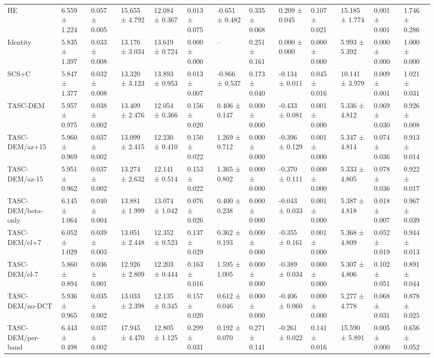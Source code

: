 \begin{table}[t]
\begin{tabular}{lllllllllllll}
HE & 6.559 ± 1.224 & 0.057 ± 0.005 & 15.655 ± 4.792 & 12.084 ± 0.367 & 0.013 ± 0.075 & -0.651 ± 0.482 & 0.335 ± 0.068 & 0.209 ± 0.045 & 0.107 ± 0.021 & 15.185 ± 1.774 & 0.001 ± 0.001 & 1.746 ± 0.286 \\
Identity & 5.835 ± 1.397 & 0.033 ± 0.008 & 13.176 ± 3.034 & 13.619 ± 0.724 & 0.000 ± 0.000 & -- & 0.251 ± 0.161 & 0.000 ± 0.000 & 0.000 ± 0.000 & 5.993 ± 5.392 & 0.000 ± 0.000 & 1.000 ± 0.000 \\
SCS+C & 5.847 ± 1.377 & 0.032 ± 0.008 & 13.320 ± 3.123 & 13.893 ± 0.953 & 0.013 ± 0.007 & -0.866 ± 0.537 & 0.173 ± 0.040 & -0.134 ± 0.011 & 0.045 ± 0.016 & 10.141 ± 3.979 & 0.009 ± 0.001 & 1.021 ± 0.031 \\
TASC-DEM & 5.957 ± 0.975 & 0.038 ± 0.002 & 13.409 ± 2.476 & 12.054 ± 0.366 & 0.156 ± 0.020 & 0.406 ± 0.147 & 0.000 ± 0.000 & -0.433 ± 0.081 & 0.001 ± 0.000 & 5.336 ± 4.812 & 0.069 ± 0.030 & 0.926 ± 0.008 \\
TASC-DEM/az+15 & 5.960 ± 0.969 & 0.037 ± 0.002 & 13.099 ± 2.415 & 12.230 ± 0.410 & 0.150 ± 0.022 & 1.269 ± 0.712 & 0.000 ± 0.000 & -0.396 ± 0.129 & 0.001 ± 0.000 & 5.347 ± 4.814 & 0.074 ± 0.036 & 0.913 ± 0.014 \\
TASC-DEM/az-15 & 5.951 ± 0.962 & 0.037 ± 0.002 & 13.274 ± 2.632 & 12.141 ± 0.514 & 0.153 ± 0.022 & 1.365 ± 0.802 & 0.000 ± 0.000 & -0.370 ± 0.111 & 0.000 ± 0.000 & 5.333 ± 4.805 & 0.078 ± 0.036 & 0.922 ± 0.017 \\
TASC-DEM/beta-only & 6.145 ± 1.064 & 0.040 ± 0.004 & 13.881 ± 1.999 & 13.074 ± 1.042 & 0.076 ± 0.026 & 0.400 ± 0.238 & 0.000 ± 0.000 & -0.043 ± 0.033 & 0.001 ± 0.000 & 5.387 ± 4.818 & 0.018 ± 0.007 & 0.967 ± 0.039 \\
TASC-DEM/el+7 & 6.052 ± 1.029 & 0.039 ± 0.003 & 13.051 ± 2.448 & 12.352 ± 0.523 & 0.137 ± 0.029 & 0.362 ± 0.193 & 0.000 ± 0.000 & -0.355 ± 0.161 & 0.001 ± 0.000 & 5.368 ± 4.809 & 0.052 ± 0.019 & 0.944 ± 0.013 \\
TASC-DEM/el-7 & 5.860 ± 0.894 & 0.036 ± 0.001 & 12.926 ± 2.809 & 12.203 ± 0.444 & 0.163 ± 0.016 & 1.595 ± 1.005 & 0.000 ± 0.000 & -0.389 ± 0.034 & 0.000 ± 0.000 & 5.307 ± 4.806 & 0.102 ± 0.051 & 0.891 ± 0.044 \\
TASC-DEM/no-DCT & 5.936 ± 0.965 & 0.035 ± 0.002 & 13.033 ± 2.398 & 12.135 ± 0.345 & 0.157 ± 0.020 & 0.612 ± 0.046 & 0.000 ± 0.000 & -0.406 ± 0.060 & 0.000 ± 0.000 & 5.277 ± 4.778 & 0.068 ± 0.031 & 0.878 ± 0.025 \\
TASC-DEM/per-band & 6.443 ± 0.498 & 0.037 ± 0.002 & 17.945 ± 4.470 & 12.805 ± 1.125 & 0.299 ± 0.031 & 0.192 ± 0.070 & 0.271 ± 0.141 & -0.261 ± 0.022 & 0.141 ± 0.016 & 15.590 ± 5.891 & 0.005 ± 0.000 & 0.656 ± 0.052 \\

\end{tabular}
\end{table}
